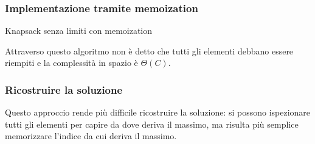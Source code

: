 \subsubsection{Implementazione tramite memoization}
\begin{algorithm}[H]
\DontPrintSemicolon
{}





\SetKwFunction{}{}
\SetKwFunction{}{}
\SetKwFunction{}{}
\SetKwFunction{}{}

\caption{Knapsack senza limiti con memoization}

\Int\Space{}

\Int\Space{}


\end{algorithm}
Attraverso questo algoritmo non \`e detto che tutti gli elementi debbano essere riempiti e la complessit\`a in spazio \`e $\Theta(C)$.
\subsubsection{Ricostruire la soluzione}
Questo approccio rende pi\`u difficile ricostruire la soluzione: si possono ispezionare tutti gli elementi per capire da dove deriva il massimo, ma 
risulta pi\`u semplice memorizzare l'indice da cui deriva il massimo. 
